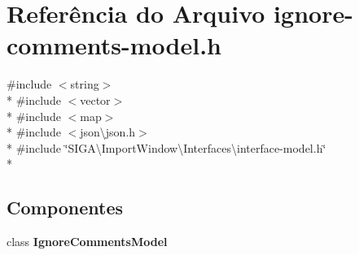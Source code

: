 \section{Referência do Arquivo ignore-\/comments-\/model.h}
\label{ignore-comments-model_8h}
{\ttfamily \#include $<$string$>$}\\*
{\ttfamily \#include $<$vector$>$}\\*
{\ttfamily \#include $<$map$>$}\\*
{\ttfamily \#include $<$json\textbackslash{}json.\+h$>$}\\*
{\ttfamily \#include \char`\"{}S\+I\+G\+A\textbackslash{}\+Import\+Window\textbackslash{}\+Interfaces\textbackslash{}interface-\/model.\+h\char`\"{}}\\*
\subsection*{Componentes}
\begin{DoxyCompactItemize}
\item 
class {\bf Ignore\+Comments\+Model}
\end{DoxyCompactItemize}
